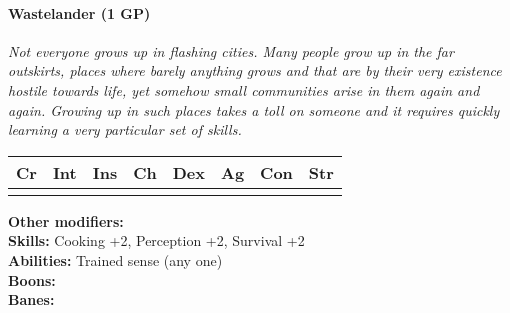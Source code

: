 \paragraph*{Wastelander (1 GP)}
\textit{Not everyone grows up in flashing cities. Many people grow up in the far outskirts, places where barely anything grows and that are by their very existence hostile towards life, yet somehow small communities arise in them again and again.
	Growing up in such places takes a toll on someone and it requires quickly learning a very particular set of skills.}\par
\begin{tabular}{|l|l|l|l|l|l|l|l|}
	\hline
	Cr & Int & Ins & Ch & Dex & Ag & Con & Str \\ \hline
	&  &  &  &  &  &  &  \\ \hline
\end{tabular}\par
\noindent\textbf{Other modifiers:} \\
\textbf{Skills:} Cooking +2,
Perception +2,
Survival +2\\
\textbf{Abilities:} Trained sense (any one)\\
\textbf{Boons:} \\
\textbf{Banes:} \\

